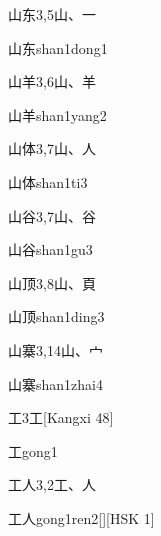 \begin{entry}{山东}{3,5}{⼭、⼀}
  \begin{phonetics}{山东}{shan1dong1}
  \end{phonetics}
\end{entry}

\begin{entry}{山羊}{3,6}{⼭、⽺}
  \begin{phonetics}{山羊}{shan1yang2}
  \end{phonetics}
\end{entry}

\begin{entry}{山体}{3,7}{⼭、⼈}
  \begin{phonetics}{山体}{shan1ti3}
  \end{phonetics}
\end{entry}

\begin{entry}{山谷}{3,7}{⼭、⾕}
  \begin{phonetics}{山谷}{shan1gu3}
  \end{phonetics}
\end{entry}

\begin{entry}{山顶}{3,8}{⼭、⾴}
  \begin{phonetics}{山顶}{shan1ding3}
  \end{phonetics}
\end{entry}

\begin{entry}{山寨}{3,14}{⼭、⼧}
  \begin{phonetics}{山寨}{shan1zhai4}
  \end{phonetics}
\end{entry}

\begin{entry}{工}{3}{⼯}[Kangxi 48]
  \begin{phonetics}{工}{gong1}
  \end{phonetics}
\end{entry}

\begin{entry}{工人}{3,2}{⼯、⼈}
  \begin{phonetics}{工人}{gong1ren2}[][HSK 1]
  \end{phonetics}
\end{entry}

